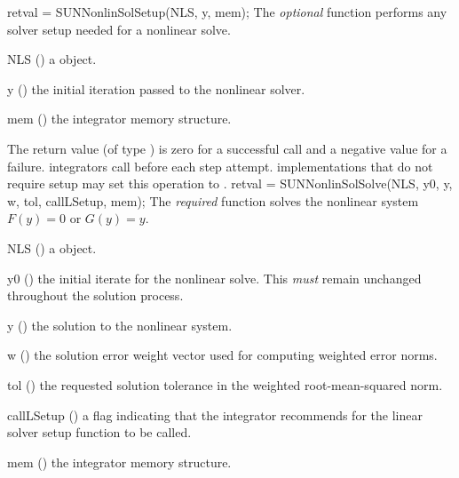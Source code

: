 {
  retval = SUNNonlinSolSetup(NLS, y, mem);
}
{
  The \textit{optional} function  performs any
  solver setup needed for a nonlinear solve.
}
{
  \begin{args}[NLS]
  \item[NLS] ()
    a {\sunnonlinsol} object.
  \item[y] ()
    the initial iteration passed to the nonlinear solver.
  \item[mem] ()
    the {\sundials} integrator memory structure.
  \end{args}
}
{
  The return value  (of type ) is zero for a
  successful call and a negative value for a failure.
}
{
  {\sundials} integrators call  before each step
  attempt. {\sunnonlinsol} implementations that do not require setup  may set
  this operation to .
}
{
  retval = SUNNonlinSolSolve(NLS, y0, y, w, tol, callLSetup, mem);
}
{
  The \textit{required} function  solves the
  nonlinear system $F(y)=0$ or $G(y)=y$.
}
{
  \begin{args}[callLSetup]
  \item[NLS] ()
    a {\sunnonlinsol} object.
  \item[y0] ()
    the initial iterate for the nonlinear solve.  This \textit{must}
    remain unchanged throughout the solution process.
  \item[y] ()
    the solution to the nonlinear system.
  \item[w] ()
    the solution error weight vector used for computing weighted error norms.
  \item[tol] ()
    the requested solution tolerance in the weighted root-mean-squared norm.
  \item[callLSetup] ()
    a flag indicating that the integrator recommends for the linear
    solver setup function to be called.
  \item[mem] ()
    the {\sundials} integrator memory structure.
  \end{args}
}
